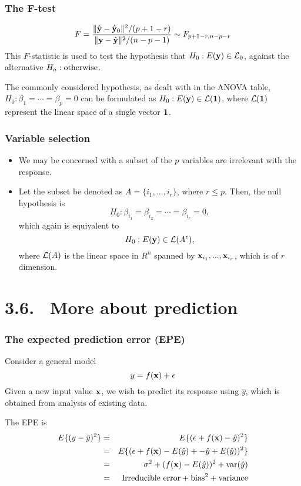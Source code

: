 \documentclass{beamer}
\def\bfx{{\bf x}}
\def\bfy{{\bf y}}
\begin{document}
      \begin{frame}
      	\frametitle{The F-test}
      	$$ F = {\|\hat {\bf y} - \hat {\bf y}_0\|^2/(p+1-r)
      		\over
      		\|{\bf y} - \hat {\bf y}\|^2/(n-p-1) } \sim F_{p+1-r, n-p-r}
      	$$
      	This $F$-statistic is used to test the hypothesis that $H_0: E(\bfy) \in {\cal L}_0$, against
      	the alternative $H_a: \hbox{otherwise}$.
      	
      	The commonly considered hypothesis, as dealt with in the ANOVA table, $H_0: \beta_1=\cdots = \beta_p=0$
      	can be formulated as
      	$H_0: E(\bfy) \in {\cal L}({\bf 1})$, where ${\cal L}({\bf 1})$ represent the linear space of a single vector
      	${\bf 1}$.
      	
      	
      \end{frame}
      
      \begin{frame}
      	\frametitle{Variable selection}
      	\begin{itemize}
      		\item We may be concerned with a subset of the $p$  variables are irrelevant
      		with the response. 
      		
      		\item Let the subset be denoted as $A=\{ i_1, ..., i_r\}$, where $r \leq p$.
      		Then, the null hypothesis is
      		$$H_0: \beta_{i_1}= \beta_{i_2} = \cdots = \beta_{i_r} =0, $$
      		which again is equivalent to
      		$$ H_0: E(\bfy) \in {\cal L}(A^c), $$
      		where ${\cal L}(A)$ is the linear space in $R^n$ spanned by $\bfx_{i_1}, ..., \bfx_{i_r}$, which is
      		of $r$ dimension.	
      		
      		
      	\end{itemize}
      \end{frame}
     
      \section{3.6. \ More about prediction }
      
      \begin{frame} 
      	\frametitle{The expected prediction error (EPE)}
      	
      	Consider a general model
      	$$ y= f(\bfx) + \epsilon$$
      	Given a new input value $\bfx$, we wish to predict its response using $\hat y$, which is obtained 
      	from analysis of existing data.
      	
      	The EPE is
      	\begin{eqnarray*}
      	 E \{ ( y- \hat y)^2 \} &=& E\{(\epsilon + f(\bfx) - \hat y)^2\} \\
      	 &=& E\{ (\epsilon + f(\bfx) - E(\hat y) + - \hat y + E(\hat y) )^2 \} \\
      	 &=& \sigma^2 + (f(\bfx)- E(\hat y))^2 + \hbox{var}(\hat y) \\
      	 &=& \hbox{Irreducible error} + \hbox{bias}^2 + \hbox{variance} \\
      	\end{eqnarray*}
      	
      \end{frame} 
      
\end{document}
